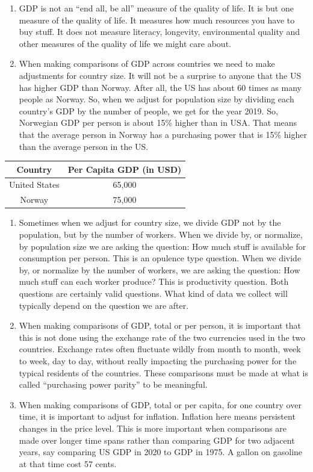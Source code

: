 \documentclass[
]{book}
\begin{document}
\begin{enumerate}
\def\labelenumi{\arabic{enumi}.}
\item
  GDP is not an ``end all, be all'' measure of the quality of life. It is but one measure of the quality of life. It measures how much resources you have to buy stuff. It does not measure literacy, longevity, environmental quality and other measures of the quality of life we might care about.
\item
  When making comparisons of GDP across countries we need to make adjustments for country size. It will not be a surprise to anyone that the US has higher GDP than Norway. After all, the US has about 60 times as many people as Norway. So, when we adjust for population size by dividing each country's GDP by the number of people, we get for the year 2019.
  So, Norwegian GDP per person is about 15\% higher than in USA. That means that the average person in Norway has a purchasing power that is 15\% higher than the average person in the US.
\end{enumerate}

\begin{longtable}[]{@{}cc@{}}
\toprule
Country & Per Capita GDP (in USD) \\
\midrule
\endhead
United States & 65,000 \\
Norway & 75,000 \\
\bottomrule
\end{longtable}

\begin{enumerate}
\def\labelenumi{\arabic{enumi}.}
\item
  Sometimes when we adjust for country size, we divide GDP not by the population, but by the number of workers. When we divide by, or normalize, by population size we are asking the question: How much stuff is available for consumption per person. This is an opulence type question. When we divide by, or normalize by the number of workers, we are asking the question: How much stuff can each worker produce? This is productivity question. Both questions are certainly valid questions. What kind of data we collect will typically depend on the question we are after.
\item
  When making comparisons of GDP, total or per person, it is important that this is not done using the exchange rate of the two currencies used in the two countries. Exchange rates often fluctuate wildly from month to month, week to week, day to day, without really impacting the purchasing power for the typical residents of the countries. These comparisons must be made at what is called ``purchasing power parity'' to be meaningful.
\item
  When making comparisons of GDP, total or per capita, for one country over time, it is important to adjust for inflation. Inflation here means persistent changes in the price level. This is more important when comparisons are made over longer time spans rather than comparing GDP for two adjacent years, say comparing US GDP in 2020 to GDP in 1975. A gallon on gasoline at that time cost 57 cents.
\end{enumerate}
\end{document}
